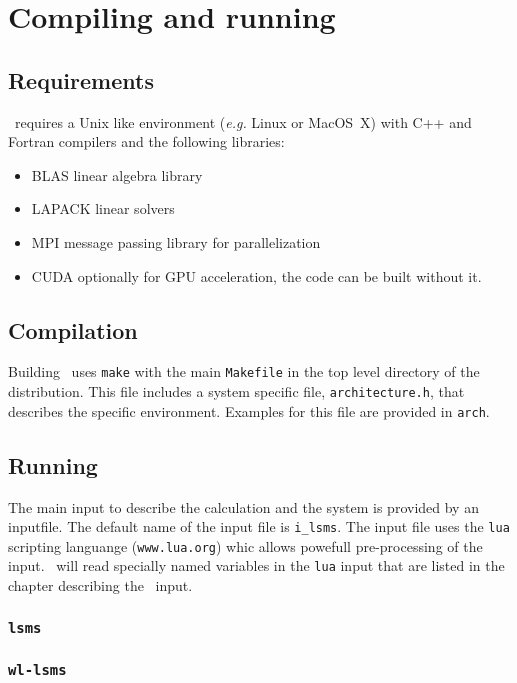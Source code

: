 \chapter{Compiling and running \LSMS}
\section{Requirements}
\LSMS\ requires a Unix like environment (\textit{e.g.}
Linux or MacOS~X) with C++ and Fortran compilers and the following libraries:
\begin{itemize}
\item BLAS linear algebra library
\item LAPACK linear solvers
\item MPI message passing library for parallelization
\item CUDA optionally for GPU acceleration, the code can be built without it.
\end{itemize}

\section{Compilation}
Building \LSMS\ uses \texttt{make} with the main \texttt{Makefile} in the top level directory of the distribution. This file includes a system specific file, \texttt{architecture.h}, that describes the specific environment. Examples for this file are provided in \texttt{arch}.


\section{Running}

The main input to describe the calculation and the system is provided by an
inputfile. The default name of the input file is \texttt{i\_lsms}.
The input file uses the \texttt{lua} scripting languange (\texttt{www.lua.org}) whic allows
powefull pre-processing of the input.
\LSMS\ will read specially named variables in the \texttt{lua} input that are listed in the chapter describing
the \LSMS\ input.

\subsection{\texttt{lsms}}

\subsection{\texttt{wl-lsms}}

